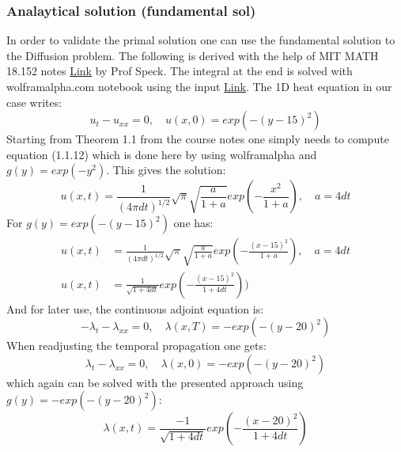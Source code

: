 \subsubsection{Analaytical solution (fundamental sol)}
In order to validate the primal solution one can use the fundamental solution to the Diffusion problem. The following is derived with the help of MIT MATH 18.152 notes \href{http://math.mit.edu/~jspeck/18.152_Fall2011/Lecture%20notes/18152%20lecture%20notes%20-%205.pdf}{Link} by Prof Speck. The integral at the end is solved with wolframalpha.com notebook using the input	
\href{https://sandbox.open.wolframcloud.com/app/objects/a62c75f0-0ef8-44e4-8ba9-4eedb585f643#sidebar=compute}{Link}.
The 1D heat equation in our case writes:
\begin{equation}
u_t-u_{xx} = 0,\quad u(x,0) = exp\left( -(y-15)^2 \right)
\end{equation}
Starting from Theorem 1.1 from the course notes one simply needs to compute equation (1.1.12) which is done here by using wolframalpha and $g(y)=exp\left( -y^2 \right)$. This gives the solution:
\begin{equation}
u(x,t) = \frac{1}{(4\pi d t)^{1/2}} \sqrt{\pi} \sqrt{\frac{a}{1+a}}exp\left( -\frac{x^2}{1+a} \right),\quad a= 4dt
\end{equation}
For $g(y)=exp\left( -(y-15)^2 \right)$ one has:
\begin{align}
u(x,t) &= \frac{1}{(4\pi d t)^{1/2}} \sqrt{\pi} \sqrt{\frac{a}{1+a}}exp\left( -\frac{(x-15)^2}{1+a} \right),\quad a= 4dt \\
u(x,t) &= \frac{1}{\sqrt{1+4dt}}exp\left(-\frac{(x-15)^2}{1+4dt} \right))
\end{align}
And for later use, the continuous adjoint equation is:
\begin{equation}
-\lambda_t-\lambda_{xx} = 0,\quad \lambda(x,T) = -exp\left( -(y-20)^2 \right)
\end{equation}
When readjusting the temporal propagation one gets:
\begin{equation}
\lambda_t-\lambda_{xx} = 0,\quad \lambda(x,0) = -exp\left( -(y-20)^2 \right)
\end{equation}
which again can be solved with the presented approach using $g(y)=-exp\left( -(y-20)^2 \right)$:
\begin{equation}
\lambda(x,t) = \frac{-1}{\sqrt{1+4dt}}exp\left(-\frac{(x-20)^2}{1+4dt} \right)
\end{equation}

